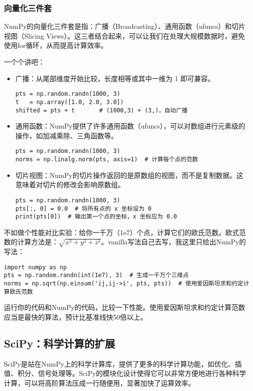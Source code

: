 \documentclass[../main.tex]{subfiles}
\begin{document}
\subsubsection{向量化三件套}

NumPy的向量化三件套是指：广播（Broadcasting）、通用函数（ufuncs）和切片视图（Slicing Views）。这三者结合起来，可以让我们在处理大规模数据时，避免使用for循环，从而提高计算效率。

一个个讲吧：
\begin{itemize}
  \item 广播：从尾部维度开始比较，长度相等或其中一维为 1 即可兼容。
    \begin{lstlisting}
pts = np.random.randn(1000, 3)
t   = np.array([1.0, 2.0, 3.0])
shifted = pts + t       # (1000,3) + (3,)，自动广播
    \end{lstlisting}
  \item 通用函数：NumPy提供了许多通用函数（ufuncs），可以对数组进行元素级的操作，如加减乘除、三角函数等。
    \begin{lstlisting}
pts = np.random.randn(1000, 3)
norms = np.linalg.norm(pts, axis=1)  # 计算每个点的范数
\end{lstlisting}
  \item 切片视图：NumPy的切片操作返回的是原数组的视图，而不是复制数据。这意味着对切片的修改会影响原数组。
    \begin{lstlisting}
pts = np.random.randn(1000, 3)
pts[:, 0] = 0.0  # 将所有点的 x 坐标设为 0
print(pts[0])  # 输出第一个点的坐标，x 坐标应为 0.0
    \end{lstlisting}
\end{itemize}

不如做个性能对比实验：给你一千万（1e7）个点，计算它们的欧氏范数。欧式范数的计算方法是：$\sqrt{x^2 + y^2 + z^2}$。vanilla写法自己去写，我这里只给出NumPy的写法：
\begin{lstlisting}
import numpy as np
pts = np.random.randn(int(1e7), 3)  # 生成一千万个三维点
norms = np.sqrt(np.einsum('ij,ij->i', pts, pts))  # 使用爱因斯坦求和约定计算欧氏范数
\end{lstlisting}
运行你的代码和NumPy的代码，比较一下性能。使用爱因斯坦求和约定计算范数应当是最快的算法，预计比基准线快50倍以上。

\subsection{SciPy：科学计算的扩展}

SciPy是站在NumPy上的科学计算库，提供了更多的科学计算功能，如优化、插值、积分、信号处理等。SciPy的模块化设计使得它可以非常方便地进行各种科学计算，可以将高阶算法压成一行随便用，显著加快了运算效率。
\end{document}
